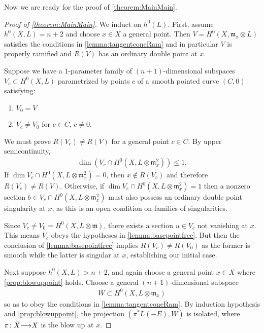 \documentclass[11pt,reqno]{amsart}
\theoremstyle{plain}
\theoremstyle{definition}
\theoremstyle{remark}
\numberwithin{equation}{section}
\DeclareMathOperator{\dm}{dim}
\renewcommand{\to}{{\longrightarrow}}
\numberwithin{equation}{section}
\begin{document}
Now we are ready for the proof of \autoref{theorem:MainMain}. 

\begin{proof}[Proof of \autoref{theorem:MainMain}]
  We induct on $h^{0}(L)$.  First, assume $h^{0}(X,L) = n+2$ and choose $x \in X$ a general point. Then $V  =  H^{0}(X,{\mathfrak m}_{x}\otimes L)$ satisfies the conditions in \autoref{lemma:tangentconeRam} and in particular $V$ is properly ramified and $R(V)$ has an ordinary double point at $x$.  

  Suppose we have a $1$-parameter family of $(n+1)$-dimensional subspaces $V_{c} \subset H^{0}(X,L)$ parametrized by points $c$ of a smooth pointed curve $(C,0)$ satisfying:
  \begin{enumerate}
  \item $V_{0} = V$ 
  \item $V_{c} \neq V_{0}$ for $c \in C$, $c \neq 0$.
  \end{enumerate}
  We must prove $R(V_{c}) \neq R(V)$ for a general point $c \in C$. By upper semicontinuity, 
  \begin{align*}
    \dm \left(V_{c} \cap H^{0}(X,L \otimes \mathfrak{m}^{2}_{x})\right) \leq 1.
  \end{align*}
If $\dm V_{c} \cap H^{0}(X,L \otimes \mathfrak{m}^{2}_{x}) = 0$, then $x \notin R(V_{c})$ and therefore $R(V_{c}) \neq R(V)$.  Otherwise, if $\dm V_{c} \cap H^{0}(X,L \otimes \mathfrak{m}^{2}_{x}) = 1$ then a nonzero section $b \in V_{c} \cap H^{0}(X,L \otimes \mathfrak{m}^{2}_{x})$ must also possess an ordinary double point singularity at $x$, as this is an open condition on families of singularities.

Since $V_{c} \neq V_{0} = H^{0}(X,L\otimes\mathfrak{m})$, there exists a section $u \in V_{c}$ not vanishing at $x$.  This means $V_{c}$ obeys the hypotheses in \autoref{lemma:basepointfree}. But then the conclusion of \autoref{lemma:basepointfree} implies $R(V_{c}) \neq R(V_{0})$ as the former is smooth while the latter is singular at $x$, establishing our initial case.


Next suppose $h^{0}(X,L) > n+2$, and again choose a general point $x \in X$ where \autoref{prop:blowuppoint} holds. Choose a general $(n+1)$-dimensional subspace 
\begin{align*}
  W \subset  H^{0}(X, L \otimes {\mathfrak m}_{x})
\end{align*}
so as to obey the conditions in \autoref{lemma:tangentconeRam}. By induction hypothesis and \autoref{prop:blowuppoint}, the projection $(\pi^{*}L(-E),W)$ is isolated, where $\pi\from \widetilde{X} \to X$ is the blow up at $x$.  


\end{proof}
\end{document}
